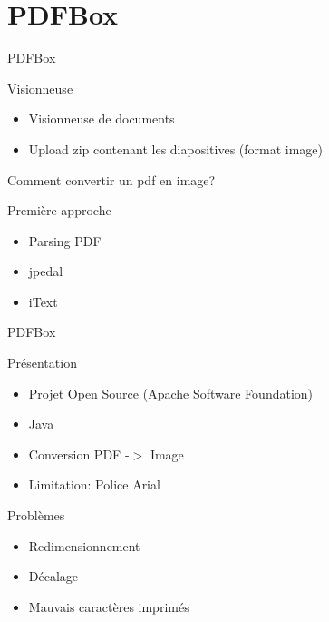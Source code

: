 \section{PDFBox}

\begin{frame}{PDFBox}
  	\begin{block}{Visionneuse}
  		 \begin{itemize}
	   		\item Visionneuse de documents
      		\item Upload zip contenant les diapositives (format image)
	 	\end{itemize}
  	\end{block}

	Comment convertir un pdf en image?

	\begin{block}{Première approche}
  		\begin{itemize}
      			\item Parsing PDF
      			\item jpedal
      			\item iText
  		\end{itemize}
	\end{block}
\end{frame}

\begin{frame}{PDFBox}
	\begin{block}{Présentation}
		\begin{itemize}
			\item Projet Open Source (Apache Software Foundation)
			\item Java 
			\item Conversion PDF -$>$ Image
			\item Limitation: Police Arial
		\end{itemize}
	\end{block}

	\begin{block}{Problèmes}
		\begin{itemize}
			\item Redimensionnement
			\item Décalage
			\item Mauvais caractères imprimés
		\end{itemize}
	\end{block}
\end{frame}

